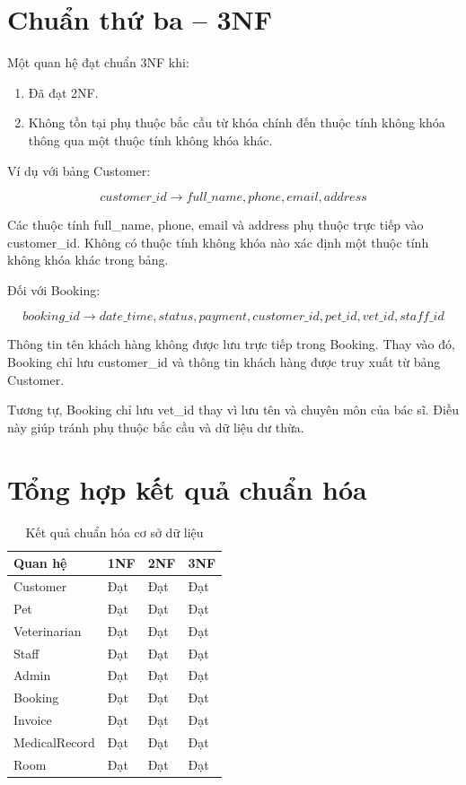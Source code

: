 \section{Chuẩn thứ ba -- 3NF}

Một quan hệ đạt chuẩn 3NF khi:

\begin{enumerate}
    \item Đã đạt 2NF.
    \item Không tồn tại phụ thuộc bắc cầu từ khóa chính đến thuộc tính không khóa thông qua một thuộc tính không khóa khác.
\end{enumerate}

Ví dụ với bảng Customer:

\[
customer\_id \rightarrow full\_name, phone, email, address
\]

Các thuộc tính full\_name, phone, email và address phụ thuộc trực tiếp vào customer\_id. Không có thuộc tính không khóa nào xác định một thuộc tính không khóa khác trong bảng.

Đối với Booking:

\[
booking\_id \rightarrow date\_time, status, payment,
customer\_id, pet\_id, vet\_id, staff\_id
\]

Thông tin tên khách hàng không được lưu trực tiếp trong Booking. Thay vào đó, Booking chỉ lưu customer\_id và thông tin khách hàng được truy xuất từ bảng Customer.

Tương tự, Booking chỉ lưu vet\_id thay vì lưu tên và chuyên môn của bác sĩ. Điều này giúp tránh phụ thuộc bắc cầu và dữ liệu dư thừa.

\section{Tổng hợp kết quả chuẩn hóa}

\begin{table}[htbp]
    \centering
    \caption{Kết quả chuẩn hóa cơ sở dữ liệu}
    \label{tab:normalization_summary}
    \begin{tabularx}{\textwidth}{|X|X|X|X|}
        \hline
        \textbf{Quan hệ} &
        \textbf{1NF} &
        \textbf{2NF} &
        \textbf{3NF} \\ \hline

        Customer & Đạt & Đạt & Đạt \\ \hline
        Pet & Đạt & Đạt & Đạt \\ \hline
        Veterinarian & Đạt & Đạt & Đạt \\ \hline
        Staff & Đạt & Đạt & Đạt \\ \hline
        Admin & Đạt & Đạt & Đạt \\ \hline
        Booking & Đạt & Đạt & Đạt \\ \hline
        Invoice & Đạt & Đạt & Đạt \\ \hline
        MedicalRecord & Đạt & Đạt & Đạt \\ \hline
        Room & Đạt & Đạt & Đạt \\ \hline
    \end{tabularx}
\end{table}

